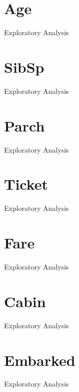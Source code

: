\section{Age} \label{section:Age}
Exploratory Analysis


\section{SibSp} \label{section:SibSp}
Exploratory Analysis


\section{Parch} \label{section:Parch}
Exploratory Analysis


\section{Ticket} \label{section:Ticket}
Exploratory Analysis


\section{Fare} \label{section:Fare}
Exploratory Analysis


\section{Cabin} \label{section:Cabin}
Exploratory Analysis


\section{Embarked} \label{section:Embarked}
Exploratory Analysis